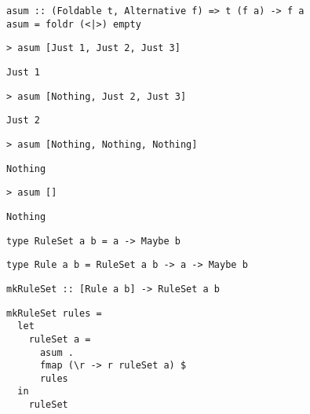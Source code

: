 \begin{frame}[fragile]
  \begin{verbatim}
asum :: (Foldable t, Alternative f) => t (f a) -> f a 
asum = foldr (<|>) empty
  \end{verbatim}
\end{frame}

\begin{frame}[fragile]
  \begin{verbatim}
> asum [Just 1, Just 2, Just 3]
  \end{verbatim}
  \onslide<+->
  \begin{verbatim}
Just 1
  \end{verbatim}
  \onslide<+->
  \begin{verbatim}
> asum [Nothing, Just 2, Just 3]
  \end{verbatim}
  \onslide<+->
  \begin{verbatim}
Just 2
  \end{verbatim}
  \onslide<+->
  \begin{verbatim}
> asum [Nothing, Nothing, Nothing]
  \end{verbatim}
  \onslide<+->
  \begin{verbatim}
Nothing
  \end{verbatim}
  \onslide<+->
  \begin{verbatim}
> asum []
  \end{verbatim}
  \onslide<+->
  \begin{verbatim}
Nothing
  \end{verbatim}
\end{frame}

\begin{frame}[fragile]
  \onslide<+->
  \begin{verbatim}
type RuleSet a b = a -> Maybe b
  \end{verbatim}

  \onslide<+->
  \begin{verbatim}
type Rule a b = RuleSet a b -> a -> Maybe b
  \end{verbatim}

  \onslide<+->
  \begin{verbatim}
mkRuleSet :: [Rule a b] -> RuleSet a b
  \end{verbatim}

  \onslide<+->
  \begin{verbatim}
mkRuleSet rules =
  let
    ruleSet a =
      asum .
      fmap (\r -> r ruleSet a) $
      rules
  in
    ruleSet
  \end{verbatim}
\end{frame}

